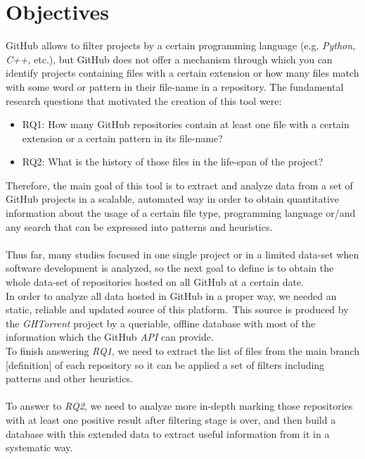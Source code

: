 \documentclass[a4paper, 12pt]{book}
\begin{document}
\chapter{Objectives}
\label{sec:objectives}
GitHub allows to filter projects by a certain programming language (e.g. \emph{Python}, \emph{C++}, etc.),
but GitHub does not offer a mechanism through which you can identify projects
containing files with a certain extension or how many files match with some word or pattern in their
file-name in a repository. The fundamental research questions that motivated the creation of this tool were:
\begin{itemize}
  \item RQ1: How many GitHub repositories contain at least one file with a certain extension or a certain
        pattern in its file-name?
  \item RQ2: What is the history of those files in the life-span of the project?
\end{itemize}
Therefore, the main goal of this tool is to extract and analyze data from a set of GitHub projects in a scalable,
automated way in order to obtain quantitative information about the usage of a certain file type, programming language
or/and any search that can be expressed into patterns and heuristics.\\\\
Thus far, many studies focused in one single project or in a limited data-set when software development is analyzed, so
the next goal to define is to obtain the whole data-set of repositories hosted on all GitHub at a certain date.\\
In order to analyze all data hosted in GitHub in a proper way, we needed an static, reliable and updated source of this platform.\
This source is produced by the \emph{GHTorrent} project by a queriable, offline database with most of the information which the
GitHub \textit{API} can provide.\\
To finish answering \emph{RQ1}, we need to extract the list of files from the main branch [definition] of each repository so
it can be applied a set of filters including patterns and other heuristics.\\\\
To answer to \emph{RQ2}, we need to analyze more in-depth marking those repositories with at least one positive result
after filtering stage is over, and then build a database with this extended data to extract useful information from it in a
systematic way.
\cleardoublepage
\end{document}
